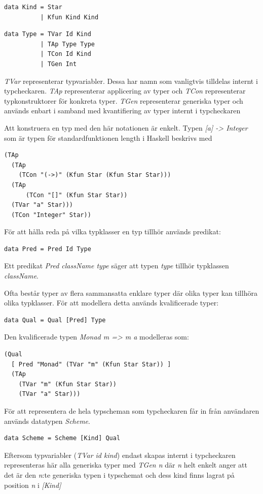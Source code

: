 \begin{lstlisting}
data Kind = Star
          | Kfun Kind Kind
\end{lstlisting}


\begin{lstlisting}
data Type = TVar Id Kind
          | TAp Type Type
          | TCon Id Kind
          | TGen Int     
\end{lstlisting}

\emph{TVar} representerar typvariabler. Dessa har namn som vanligtvis tilldelas internt i typcheckaren. \emph{TAp} representerar applicering av typer och \emph{TCon} representerar typkonstruktorer för konkreta typer. \emph{TGen} representerar
generiska typer och används enbart i samband med kvantifiering av
typer internt i typcheckaren

Att konstruera en typ med den här notationen är enkelt. Typen \emph{[a] ->
Integer} som är typen för standardfunktionen length i Haskell beskrivs med
\begin{lstlisting}
(TAp
  (TAp
    (TCon "(->)" (Kfun Star (Kfun Star Star)))
  (TAp
      (TCon "[]" (Kfun Star Star))
  (TVar "a" Star)))
  (TCon "Integer" Star))
\end{lstlisting}

För att hålla reda på vilka typklasser en typ tillhör används predikat:
\begin{lstlisting}
data Pred = Pred Id Type
\end{lstlisting}
Ett predikat \emph{Pred className type} säger att typen \emph{type} tillhör typklassen \emph{className}.

Ofta består typer av flera sammansatta enklare typer där olika typer kan tillhöra olika typklasser. För att modellera detta används kvalificerade typer:
\begin{lstlisting}
data Qual = Qual [Pred] Type
\end{lstlisting}

Den kvalificerade typen \emph{Monad m => m a} modelleras som:
\begin{lstlisting}
(Qual
  [ Pred "Monad" (TVar "m" (Kfun Star Star)) ]
  (TAp
    (TVar "m" (Kfun Star Star))
    (TVar "a" Star)))
\end{lstlisting}

För att representera de hela typscheman som typcheckaren får in från användaren används datatypen \emph{Scheme}.
\begin{lstlisting}
data Scheme = Scheme [Kind] Qual
\end{lstlisting}
Eftersom typvariabler (\emph{TVar id kind}) endast skapas internt i typcheckaren representeras här alla generiska typer med \emph{TGen n} där \emph{n} helt enkelt anger att det är den \emph{n}:te generiska typen i typschemat och dess kind finns lagrat på position \emph{n} i \emph{[Kind]}

